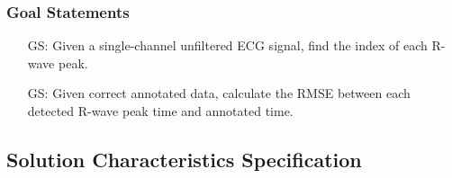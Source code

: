 \documentclass[12pt]{article}
\begin{document}
\subsubsection{Goal Statements}

\begin{itemize}

\item[GS\refstepcounter{goalnum}\thegoalnum \label{G_find_index}:] Given a
single-channel unfiltered ECG signal, find the index of each R-wave peak.

\item[GS\refstepcounter{goalnum}\thegoalnum \label{G_calculate_RMSE}:] Given
correct annotated data, calculate the RMSE between each detected R-wave peak
time and annotated time.

\end{itemize}

\subsection{Solution Characteristics Specification}


\end{document}

